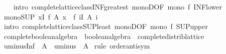 \begin{isabellebody}
%
\isadelimproof
\ \ %
\endisadelimproof
%
\isatagproof
{}\isamarkupfalse%
\ {\isacharparenleft}{\kern0pt}intro\ complete{\isacharunderscore}{\kern0pt}lattice{\isacharunderscore}{\kern0pt}class{\isachardot}{\kern0pt}INF{\isacharunderscore}{\kern0pt}greatest\ monoD{\isacharbrackleft}{\kern0pt}OF\ {\isacartoucheopen}mono\ f{\isacartoucheclose}{\isacharbrackright}{\kern0pt}\ INF{\isacharunderscore}{\kern0pt}lower{\isacharparenright}{\kern0pt}%
\endisatagproof
{\isafoldproof}%
%
\isadelimproof
\isanewline
%
\endisadelimproof
\isanewline
{}\isamarkupfalse%
\ mono{\isacharunderscore}{\kern0pt}SUP{\isacharcolon}{\kern0pt}\ {\isachardoublequoteopen}{\isacharparenleft}{\kern0pt}{\isasymSqunion}x{\isasymin}I{\isachardot}{\kern0pt}\ f\ {\isacharparenleft}{\kern0pt}A\ x{\isacharparenright}{\kern0pt}{\isacharparenright}{\kern0pt}\ {\isasymle}\ f\ {\isacharparenleft}{\kern0pt}{\isasymSqunion}i{\isasymin}I{\isachardot}{\kern0pt}\ A\ i{\isacharparenright}{\kern0pt}{\isachardoublequoteclose}\isanewline
%
\isadelimproof
\ \ %
\endisadelimproof
%
\isatagproof
{}\isamarkupfalse%
\ {\isacharparenleft}{\kern0pt}intro\ complete{\isacharunderscore}{\kern0pt}lattice{\isacharunderscore}{\kern0pt}class{\isachardot}{\kern0pt}SUP{\isacharunderscore}{\kern0pt}least\ monoD{\isacharbrackleft}{\kern0pt}OF\ {\isacartoucheopen}mono\ f{\isacartoucheclose}{\isacharbrackright}{\kern0pt}\ SUP{\isacharunderscore}{\kern0pt}upper{\isacharparenright}{\kern0pt}%
\endisatagproof
{\isafoldproof}%
%
\isadelimproof
\isanewline
%
\endisadelimproof
\isanewline
{}\isamarkupfalse%
\isanewline
\isanewline
{}\isamarkupfalse%
\isanewline
\isanewline
{}\isamarkupfalse%
\ complete{\isacharunderscore}{\kern0pt}boolean{\isacharunderscore}{\kern0pt}algebra\ {\isacharequal}{\kern0pt}\ boolean{\isacharunderscore}{\kern0pt}algebra\ {\isacharplus}{\kern0pt}\ complete{\isacharunderscore}{\kern0pt}distrib{\isacharunderscore}{\kern0pt}lattice\isanewline
{}\isanewline
\isanewline
{}\isamarkupfalse%
\ uminus{\isacharunderscore}{\kern0pt}Inf{\isacharcolon}{\kern0pt}\ {\isachardoublequoteopen}{\isacharminus}{\kern0pt}\ {\isacharparenleft}{\kern0pt}{\isasymSqinter}A{\isacharparenright}{\kern0pt}\ {\isacharequal}{\kern0pt}\ {\isasymSqunion}{\isacharparenleft}{\kern0pt}uminus\ {\isacharbackquote}{\kern0pt}\ A{\isacharparenright}{\kern0pt}{\isachardoublequoteclose}\isanewline
%
\isadelimproof
%
\endisadelimproof
%
\isatagproof
{}\isamarkupfalse%
\ {\isacharparenleft}{\kern0pt}rule\ order{\isachardot}{\kern0pt}antisym{\isacharparenright}{\kern0pt}\isanewline

\end{isabellebody}
